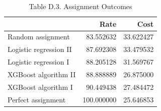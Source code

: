 \begin{table}
\caption{Table D.3. Assignment Outcomes}
\begin{tabular}{lrr}
\toprule
 & Rate & Cost \\
\midrule
Random assignment & 83.552632 & 33.622427 \\
Logistic regression II & 87.692308 & 33.479532 \\
Logistic regression I & 88.205128 & 31.569767 \\
XGBoost algorithm II & 88.888889 & 26.875000 \\
XGBoost algorithm I & 90.449438 & 27.484472 \\
Perfect assignment & 100.000000 & 25.646853 \\
\bottomrule
\end{tabular}
\end{table}

